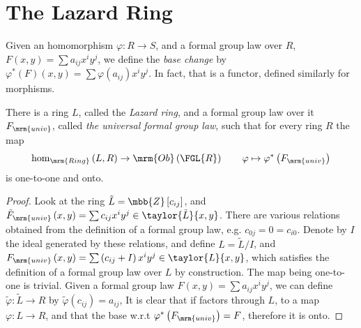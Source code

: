 \section{The Lazard Ring}

\begin{definition*}
	Given an homomorphism $\varphi: R \to S$,
	and a formal group law over $R$, $F\left(x,y\right) = \sum a_{ij} x^i y^j$,
	we define the \emph{base change} by
	$
		\varphi^*\left(F\right)\left(x,y\right)
		=
		\sum \varphi\left(a_{ij}\right) x^i y^j
	$.
	In fact, that is a functor, defined similarly for morphisms.
\end{definition*}

\begin{theorem*}
	There is a ring $L$, called the \emph{Lazard ring}, and a formal group law over it $F_\mrm{univ}$, called \emph{the universal formal group law},
	such that for every ring $R$ the map
	$$
		\hom_\mrm{Ring}\left(L,R\right)
		\to
		\mrm{Ob}\left(\FGL{R}\right)
		\qquad
		\varphi \mapsto \varphi^*\left(F_\mrm{univ}\right)
	$$
	is one-to-one and onto.
\end{theorem*}

\begin{proof}
	Look at the ring $\tilde{L} = \mbb{Z}\left[c_{ij}\right]$,
	and
	$
		\tilde{F}_\mrm{univ}\left(x,y\right)
		=
		\sum c_{ij} x^i y^j
		\in
		\taylor{\tilde{L}}{x,y}
	$.
	There are various relations obtained from the definition of a formal group law, e.g. $c_{0j} = 0 = c_{i0}$.
	Denote by $I$ the ideal generated by these relations, and define $L=\tilde{L}/I$,
	and
	$
		F_\mrm{univ}\left(x,y\right)
		=
		\sum \left(c_{ij} + I\right) x^i y^j
		\in
		\taylor{L}{x,y}
	$,
	which satisfies the definition of a formal group law over $L$ by construction.
	The map being one-to-one is trivial.
	Given a formal group law $F\left(x,y\right) = \sum a_{ij} x^i y^j$,
	we can define $\tilde{\varphi}: \tilde{L} \to R$ by $\tilde{\varphi}\left(c_{ij}\right) = a_{ij}$,
	It is clear that if factors through $L$, to a map $\varphi: L \to R$, and that the base w.r.t $\varphi^*\left(F_\mrm{univ}\right) = F$,
	therefore it is onto.
\end{proof}

